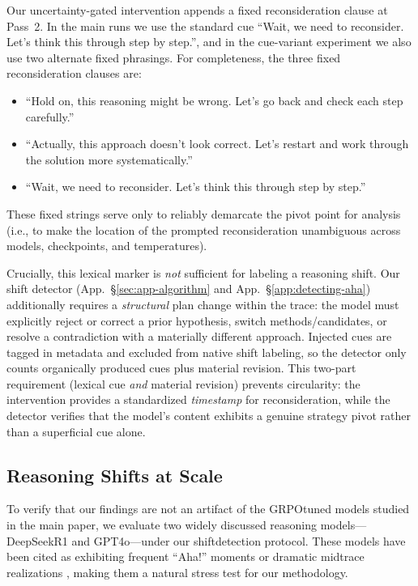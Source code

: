 Our uncertainty-gated intervention appends a fixed reconsideration clause at Pass~2. In the main runs we use the standard cue ``Wait, we need to reconsider. Let's think this through step by step.'', and in the cue-variant experiment we also use two alternate fixed phrasings. For completeness, the three fixed reconsideration clauses are:
\begin{itemize}[leftmargin=*]
    \item ``Hold on, this reasoning might be wrong. Let's go back and check each step carefully.''
    \item ``Actually, this approach doesn't look correct. Let's restart and work through the solution more systematically.''
    \item ``Wait, we need to reconsider. Let's think this through step by step.''
\end{itemize}
These fixed strings serve only to reliably demarcate the pivot point for analysis (i.e., to make the location of the prompted reconsideration unambiguous across models, checkpoints, and temperatures).

Crucially, this lexical marker is \emph{not} sufficient for labeling a reasoning shift. Our shift detector (App.~\S\ref{sec:app-algorithm} and App.~\S\ref{app:detecting-aha}) additionally requires a \emph{structural} plan change within the  trace: the model must explicitly reject or correct a prior hypothesis, switch methods/candidates, or resolve a contradiction with a materially different approach. Injected cues are tagged in metadata and excluded from native shift labeling, so the detector only counts organically produced cues plus material revision. This two-part requirement (lexical cue \emph{and} material revision) prevents circularity: the intervention provides a standardized \emph{timestamp} for reconsideration, while the detector verifies that the model's content exhibits a genuine strategy pivot rather than a superficial cue alone.

\subsection{Reasoning Shifts at Scale}
\label{app:external-models}

To verify that our findings are not an artifact of the GRPO\textendash tuned models studied in the main paper, we evaluate two widely discussed reasoning models---DeepSeek\textendash R1 and GPT\textendash 4o---under our shift\textendash detection protocol. These models have been cited as exhibiting frequent ``Aha!'' moments or dramatic mid\textendash trace realizations \citep{deepseekai2025deepseekr1incentivizingreasoningcapability}, making them a natural stress test for our methodology.

